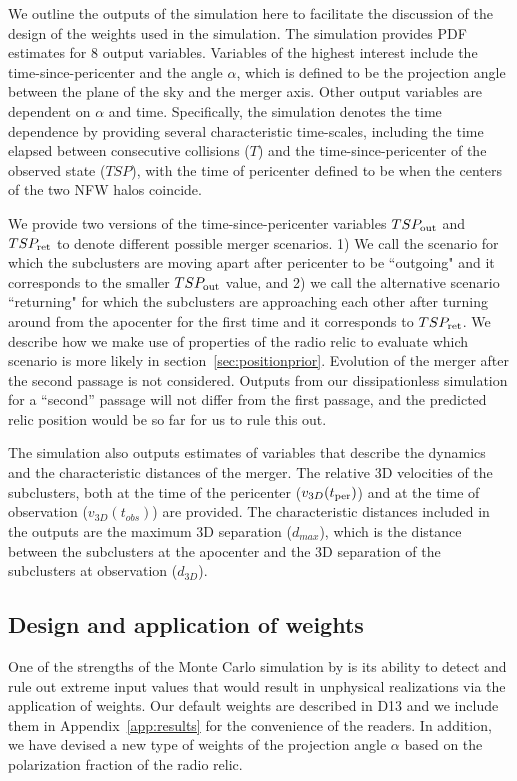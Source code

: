 \documentclass[letterpaper,useAMS,usenatbib]{mn2e}
\begin{document}
We outline the outputs of the simulation here to facilitate the discussion
of the design of the weights used in the simulation. The simulation
provides PDF estimates for 8 output variables. Variables
of the highest interest include the time-since-pericenter and the angle $\alpha$, which is
defined to be the projection angle between the plane of the sky and the
merger axis. Other output variables are dependent on $\alpha$ and time. Specifically, the simulation denotes the time dependence by
providing several characteristic time-scales, including the time
elapsed between consecutive collisions
($T$) and the time-since-pericenter of the observed state ($TSP$), with the
time of pericenter defined to be when the centers of the two NFW halos coincide. 

We provide two versions of the time-since-pericenter variables $TSP_{\rm out}$ and
$TSP_{\rm ret}$ to denote different possible merger scenarios. 1) We call the scenario for which the subclusters are
moving apart after pericenter to be ``outgoing" and it corresponds to the
smaller $TSP_{\rm out}$ value, and 2) we call the alternative scenario 
``returning" for which the subclusters are approaching each other after turning
around from the apocenter for the first time and it corresponds to $TSP_{\rm ret}$.
We describe how we make use of properties of the radio relic to evaluate
which scenario is more likely in
section~\ref{sec:positionprior}. Evolution of the merger after the second
passage is not considered. Outputs from our dissipationless simulation for
a ``second'' passage will not differ from the first passage, and the
predicted relic position would be so far for us to rule this out.
 
The simulation also outputs estimates of variables that describe
the dynamics and the characteristic distances of the merger. The relative
3D velocities of the subclusters, both at the time of the
pericenter ($v_{3D}(t_{\rm per})$) and at the time of observation
($v_{3D}(t_{obs})$) are provided. The characteristic
distances included in the outputs are the maximum 3D separation ($d_{max}$),
which is the distance between the subclusters at
the apocenter and the 3D separation of the subclusters at observation
($d_{3D}$). 
\subsection{Design and application of weights} 
\label{sec:priors}
%
One of the strengths of the Monte Carlo simulation by
 is its ability to detect and rule out extreme input values that would result in
unphysical realizations via the application of weights. 
Our default weights are described in D13 and we include them in
Appendix~\ref{app:results} for the convenience of the readers. 
In addition, we have devised a new type of weights of the projection angle $\alpha$
based on the polarization fraction of the radio relic.
\end{document}
